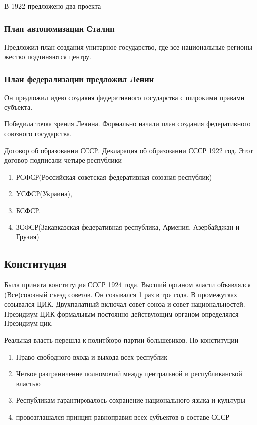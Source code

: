\documentclass[a4paper]{article}
\begin{document}
В 1922 предложено два проекта

\subsubsection{План автономизации Сталин}
Предложил план создания унитарное государство, где все национальные регионы жестко подчиняются центру.

\subsubsection{План федерализации предложил Ленин}
Он предложил идею создания федеративного государства с широкими правами субъекта.

Победила точка зрения Ленина. Формально начали план создания федеративного союзного государства.

Договор об образовании СССР. Декларация об образовании СССР 1922 год.
Этот договор подписали четыре республики

\begin{enumerate}
    \item РСФСР(Российская советская федеративная союзная республик)
    \item УСФСР(Украина),
    \item БСФСР,
    \item ЗСФСР(Закавказская федеративная республика, Армения, Азербайджан и Грузия)
\end{enumerate}

\subsection{Конституция}
Была принята конституция СССР 1924 года.
Высший органом власти объявлялся (Все)союзный съезд советов. Он созывался 1 раз в три года.
В промежутках созывался ЦИК. Двухпалатный включал совет союза и совет национальностей.
Президиум ЦИК формальным постоянно действующим органом определялся Президиум цик.

Реальная власть перешла к политбюро партии большевиков.
По конституции
\begin{enumerate}
    \item Право свободного входа и выхода всех республик
    \item Четкое разграничение полномочий между центральной и республиканской властью
    \item Республикам гарантировалось сохранение национального языка и культуры
    \item провозглашался принцип равноправия всех субъектов в составе СССР
\end{enumerate}
\end{document}
